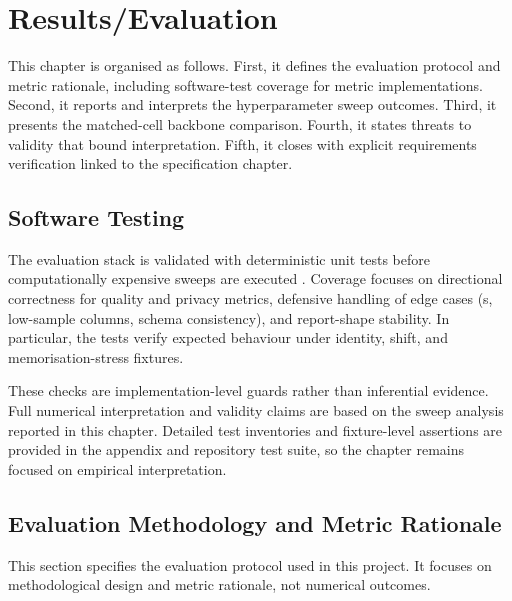 \chapter{Results/Evaluation}

This chapter is organised as follows. First, it defines the evaluation protocol and metric rationale, including software-test coverage for metric implementations. Second, it reports and interprets the hyperparameter sweep outcomes. Third, it presents the matched-cell backbone comparison. Fourth, it states threats to validity that bound interpretation. Fifth, it closes with explicit requirements verification linked to the specification chapter.

\section{Software Testing}

The evaluation stack is validated with deterministic  unit tests before computationally expensive sweeps are executed \cite{pytestProject}. Coverage focuses on directional correctness for quality and privacy metrics, defensive handling of edge cases (s, low-sample columns, schema consistency), and report-shape stability. In particular, the tests verify expected behaviour under identity, shift, and memorisation-stress fixtures.

These checks are implementation-level guards rather than inferential evidence. Full numerical interpretation and validity claims are based on the sweep analysis reported in this chapter. Detailed test inventories and fixture-level assertions are provided in the appendix and repository test suite, so the chapter remains focused on empirical interpretation.

\section{Evaluation Methodology and Metric Rationale}
\label{sec:eval-methodology}

This section specifies the evaluation protocol used in this project. It focuses on methodological design and metric rationale, not numerical outcomes.

